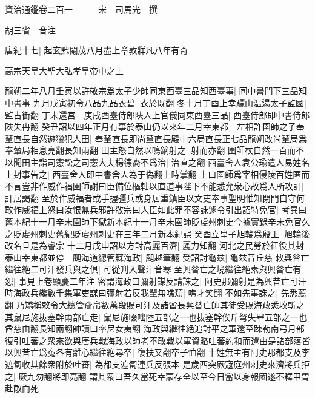 資治通鑑卷二百一　　　宋　司馬光　撰

胡三省　音注

唐紀十七|{
	起玄黓閹茂八月盡上章敦牂凡八年有奇}


高宗天皇大聖大弘孝皇帝中之上

龍朔二年八月壬寅以許敬宗爲太子少師同東西臺三品知西臺事|{
	同中書門下三品知中書事}
九月戊寅初令八品九品衣碧|{
	衣於既翻}
冬十月丁酉上幸驪山温湯太子監國|{
	監古衘翻}
丁未還宫　庚戌西臺侍郎陜人上官儀同東西臺三品|{
	西臺侍郎即中書侍郎陜失冉翻}
癸丑詔以四年正月有事於泰山仍以來年二月幸東都　左相許圉師之子奉輦直長自然遊獵犯人田|{
	奉輦直長即尚輦直長殿中六局直長正七品龍朔改尚輦局爲奉輦局相息亮翻長知兩翻}
田主怒自然以鳴鏑射之|{
	射而亦翻}
圉師杖自然一百而不以聞田主詣司憲訟之司憲大夫楊德裔不爲治|{
	治直之翻}
西臺舍人袁公瑜遣人易姓名上封事告之|{
	西臺舍人即中書舍人為于偽翻上時掌翻}
上曰圉師爲宰相侵陵百姓匿而不言豈非作威作福圉師謝曰臣備位樞軸以直道事陛下不能悉允衆心故爲人所攻訐|{
	訐居謁翻}
至於作威福者或手握彊兵或身居重鎮臣以文吏奉事聖明惟知閉門自守何敢作威福上怒曰汝恨無兵邪許敬宗曰人臣如此罪不容誅遽令引出詔特免官|{
	考異曰舊本紀十一月辛未圉師下獄新本紀十一月辛未圉師貶䖍州刺史今據實錄辛未免官久之貶䖍州刺史舊紀貶䖍州刺史在三年二月新本紀誤}
癸酉立皇子旭輪爲殷王|{
	旭輪後改名旦是為睿宗}
十二月戊申詔以方討高麗百濟|{
	麗力知翻}
河北之民勞於征役其封泰山幸東都並停　䫻海道總管蘇海政|{
	䫻越筆翻}
受詔討龜兹|{
	龜兹音丘慈}
敕興㫺亡繼往絶二可汗發兵與之俱|{
	可從刋入聲汗音寒}
至興㫺亡之境繼往絶素與興㫺亡有怨|{
	事見上卷顯慶二年注}
密謂海政曰彌射謀反請誅之|{
	阿史那彌射是為興昔亡可汗}
時海政兵纔數千集軍吏謀曰彌射若反我輩無噍類|{
	噍才笑翻}
不如先事誅之|{
	先悉薦翻}
乃矯稱敕令大總管齎帛數萬段賜可汗及諸酋長興㫺亡帥其徒受賜海政悉收斬之其鼠尼施抜塞幹兩部亡走|{
	鼠尼施啜咄陸五部之一也抜塞幹俟斤弩失畢五部之一也酋慈由翻長知兩翻帥讀曰率尼女夷翻}
海政與繼往絶追討平之軍還至踈勒南弓月部復引吐蕃之衆來欲與唐兵戰海政以師老不敢戰以軍資賂吐蕃約和而還由是諸部落皆以興昔亡爲寃各有離心繼往絶尋卒|{
	復扶又翻卒子恤翻}
十姓無主有阿史那都支及李遮匐收其餘衆附於吐蕃|{
	為都支遮匐連兵反張本}
是歲西突厥宼庭州刺史來濟將兵拒之|{
	厥九勿翻將即亮翻}
謂其衆曰吾久當死幸蒙存全以至今日當以身報國遂不釋甲胄赴敵而死

